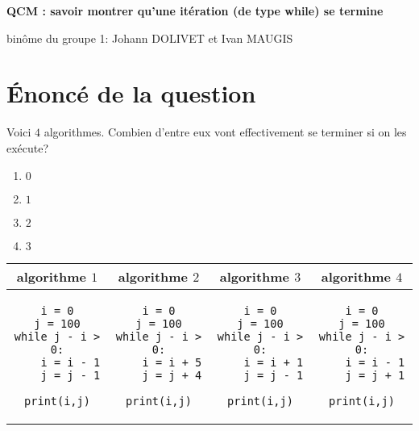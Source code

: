 \documentclass[a4paper,10pt]{article}
\begin{document}
\begin{center}
    {\Huge \textbf{QCM : savoir montrer qu’une itération (de type while) se termine}}
\end{center}


{\Large binôme du groupe 1: Johann DOLIVET et Ivan MAUGIS}

\section{\'Enoncé de la question}

Voici $4$ algorithmes. Combien d'entre eux vont effectivement se terminer si on les exécute?

\begin{multicols}{4}
\begin{enumerate}[label=\alph*)]
\item $0$
\item $1$
\item $2$
\item $3$
\end{enumerate}
\end{multicols}

\begin{tabular}{|c|c|c|c|}
\hline
algorithme $1$&
algorithme $2$&
algorithme $3$&
algorithme $4$\\
\hline
\begin{minipage}[c][3cm][c]{.23\linewidth}
\begin{verbatim}
i = 0
j = 100
while j - i > 0:
    i = i - 1
    j = j - 1
    print(i,j)
\end{verbatim}
\end{minipage}
&
\begin{minipage}[c][3cm][c]{.23\linewidth}
\begin{verbatim}
i = 0
j = 100
while j - i > 0:
    i = i + 5
    j = j + 4
    print(i,j)
\end{verbatim}
\end{minipage}
&
\begin{minipage}[c][3cm][c]{.23\linewidth}
\begin{verbatim}
i = 0
j = 100
while j - i > 0:
    i = i + 1
    j = j - 1
    print(i,j)
\end{verbatim}
\end{minipage}
&
\begin{minipage}[c][3cm][c]{.23\linewidth}
\begin{verbatim}
i = 0
j = 100
while j - i > 0:
    i = i - 1
    j = j + 1
    print(i,j)
\end{verbatim}
\end{minipage}
\\
\hline
\end{tabular}
\end{document}
